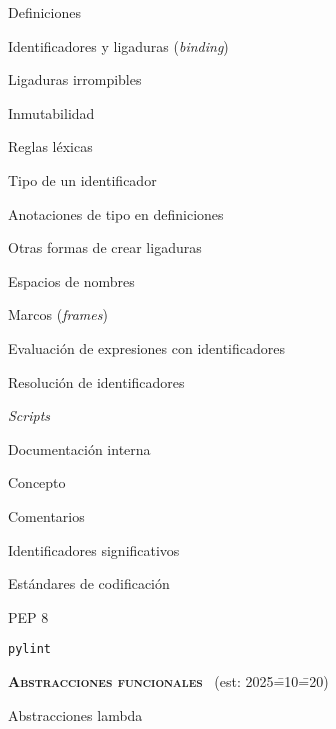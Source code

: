 \begin{longenum}
\begin{longenum}
        \item Definiciones
        \begin{longenum}
            \item Identificadores y ligaduras (\textit{binding})
            \begin{longenum}
                \item Ligaduras irrompibles
                \item Inmutabilidad
                \item Reglas léxicas
                \item Tipo de un identificador
                \item Anotaciones de tipo en definiciones
                \item Otras formas de crear ligaduras
            \end{longenum}
            \item Espacios de nombres
            \item Marcos (\textit{frames})
            \item Evaluación de expresiones con identificadores
            \begin{longenum}
                \item Resolución de identificadores
            \end{longenum}
        \end{longenum}
        \item \textit{Scripts}
        \item Documentación interna
        \begin{longenum}
            \item Concepto
            \item Comentarios
            \item Identificadores significativos
            \item Estándares de codificación
            \begin{longenum}
                \item PEP 8
                \item \texttt{pylint}
            \end{longenum}
        \end{longenum}
    \end{longenum}
    \item \textbf{\textsc{Abstracciones funcionales}} \ (est: 2025\==10\==20)
    \begin{longenum}
        \item Abstracciones lambda

\end{longenum}
\end{longenum}
